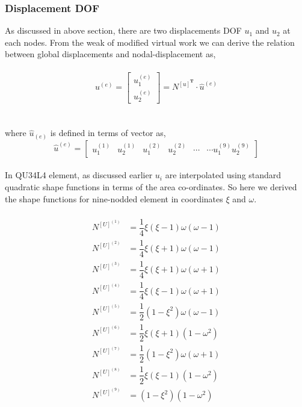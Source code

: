 \documentclass[12pt]{article}
\begin{document}
\subsubsection{ Displacement DOF}
As discussed in above section, there are two displacements DOF $u_1$ and $u_2$ at each nodes. From the weak of modified virtual work we can derive the relation between global displacements and nodal-displacement as,
\\
\\
\begin{equation}\label{threethree}
u^{(e)}=
\begin{bmatrix}
u_1^{(e)}\\
u_2^{(e)}
\end{bmatrix}
=N^{[u]^{\textbf{T}}}\cdot \hat{u}^{(e)}
\end{equation}
\\
\\
where $\hat{u}_{(e)}$ is defined in terms of vector as,
\begin{equation}\label{threefour}
\hat u^{(e)}=
\begin{bmatrix}
u_1^{(1)}&u_2^{(1)}&u_1^{(2)}&u_2^{(2)}&\cdots &\cdots u_1^{(9)} u_2^{(9)}
\end{bmatrix}
\end{equation}
\\
In QU34L4 element, as discussed earlier $u_i$ are interpolated using standard quadratic shape functions in terms of the area co-ordinates. So here we derived the shape functions for nine-nodded element in coordinates $\xi$ and $\omega$.
\\
\\
\begin{equation}\label{threefive}
\begin{aligned}
N^{[U]^{(1)}} &= \dfrac{1}{4}\xi(\xi-1)\omega(\omega-1)  \\
N^{[U]^{(2)}} &= \dfrac{1}{4}\xi(\xi+1)\omega(\omega-1)  \\
N^{[U]^{(3)}} &= \dfrac{1}{4}\xi(\xi+1)\omega(\omega+1)  \\
N^{[U]^{(4)}} &= \dfrac{1}{4}\xi(\xi-1)\omega(\omega+1)  \\
N^{[U]^{(5)}} &= \dfrac{1}{2}(1-\xi^2)\omega(\omega-1)   \\
N^{[U]^{(6)}} &= \dfrac{1}{2}\xi(\xi+1)(1-\omega^2)  \\
N^{[U]^{(7)}} &= \dfrac{1}{2}(1-\xi^2)\omega(\omega+1)  \\
N^{[U]^{(8)}} &= \dfrac{1}{2}\xi(\xi-1)(1-\omega^2) \\
N^{[U]^{(9)}} &= (1-\xi^2)(1-\omega^2)  \\
\end{aligned}
\end{equation}
\end{document}
